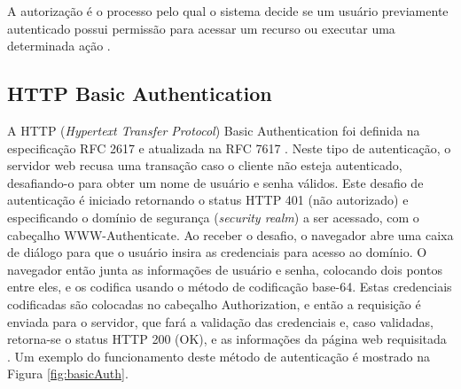 \documentclass[12pt]{article}
\begin{document}
A autorização é o processo pelo qual o sistema decide se um usuário previamente autenticado 
possui permissão para acessar um recurso ou executar uma determinada ação \cite{SPILCA2020}.

\noindent [...]




\subsection{HTTP Basic Authentication}

A HTTP (\emph{Hypertext Transfer Protocol}) Basic Authentication foi definida na especificação 
RFC 2617 \cite{RFC2617} e atualizada na RFC 7617 \cite{RFC7617}. Neste tipo de autenticação, o servidor
web recusa uma transação caso o cliente não esteja autenticado, desafiando-o para obter um nome de usuário
e senha válidos. Este desafio de autenticação é iniciado retornando o status HTTP 401 (não autorizado) e
especificando o domínio de segurança (\emph{security realm}) a ser acessado, com o cabeçalho WWW-Authenticate.
Ao receber o desafio, o navegador abre uma caixa de diálogo para que o usuário insira as credenciais para 
acesso ao domínio. O navegador então junta as informações de usuário e senha, colocando dois pontos entre eles,
e os codifica usando o método de codificação base-64. Estas credenciais codificadas são colocadas no cabeçalho
Authorization, e então a requisição é enviada para o servidor, que fará a validação das credenciais e, caso
validadas, retorna-se o status HTTP 200 (OK), e as informações da página web requisitada \cite{GOURLEY2002}.
Um exemplo do funcionamento deste método de autenticação é mostrado na Figura \ref{fig:basicAuth}.

\end{document}
